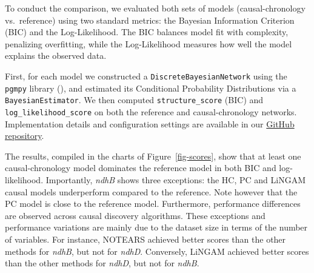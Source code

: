 \documentclass[
]{article}
\theoremstyle{definition}
\theoremstyle{remark}
\begin{document}
To conduct the comparison, we evaluated both sets of models
(causal-chronology vs.~reference) using two standard metrics: the
Bayesian Information Criterion (BIC) and the Log-Likelihood. The BIC
balances model fit with complexity, penalizing overfitting, while the
Log-Likelihood measures how well the model explains the observed data.

First, for each model we constructed a \texttt{DiscreteBayesianNetwork}
using the \texttt{pgmpy} library
(), and estimated its Conditional
Probability Distributions via a \texttt{BayesianEstimator}. We then
computed \texttt{structure\_score} (BIC) and
\texttt{log\_likelihood\_score} on both the reference and
causal-chronology networks. Implementation details and configuration
settings are available in our
\href{https://github.com/cambroise/chloroDAG}{GitHub repository}.

The results, compiled in the charts of Figure~\ref{fig-scores}, show
that at least one causal-chronology model dominates the reference model
in both BIC and log-likelihood. Importantly, \emph{ndhB} shows three
exceptions: the HC, PC and LiNGAM causal models underperform compared to
the reference. Note however that the PC model is close to the reference
model. Furthermore, performance differences are observed across causal
discovery algorithms. These exceptions and performance variations are
mainly due to the dataset size in terms of the number of variables. For
instance, NOTEARS achieved better scores than the other methods for
\emph{ndhB}, but not for \emph{ndhD}. Conversely, LiNGAM achieved better
scores than the other methods for \emph{ndhD}, but not for \emph{ndhB}.
\end{document}
